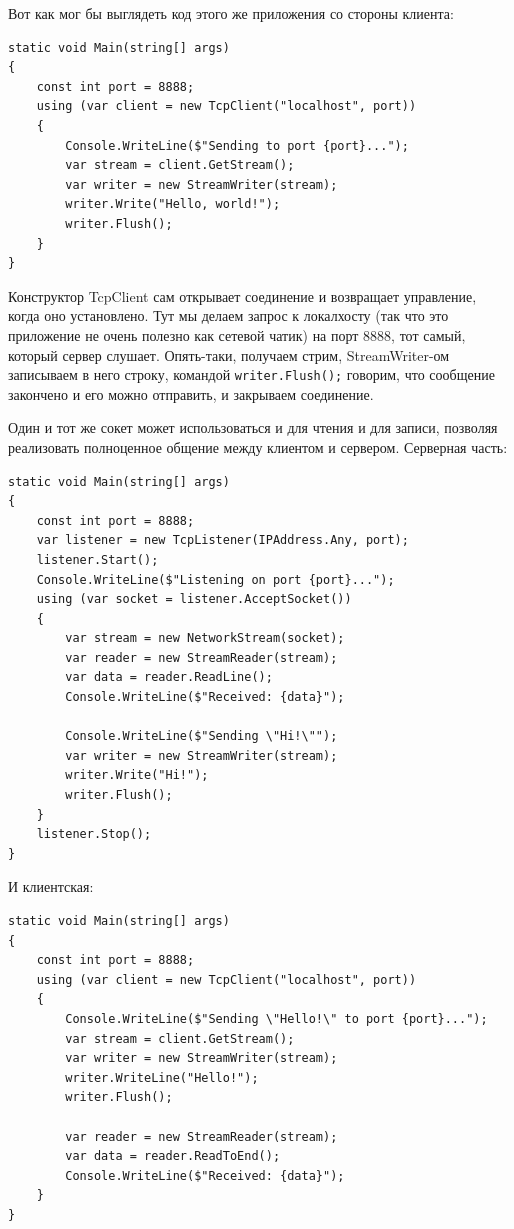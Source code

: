 \documentclass[a5paper]{article}
\begin{document}
Вот как мог бы выглядеть код этого же приложения со стороны клиента:

\begin{verbatim}
static void Main(string[] args)
{
    const int port = 8888;
    using (var client = new TcpClient("localhost", port))
    {
        Console.WriteLine($"Sending to port {port}...");
        var stream = client.GetStream();
        var writer = new StreamWriter(stream);
        writer.Write("Hello, world!");
        writer.Flush();
    }
}
\end{verbatim}

Конструктор TcpClient сам открывает соединение и возвращает управление, когда оно установлено. Тут мы делаем запрос к локалхосту (так что это приложение не очень полезно как сетевой чатик) на порт 8888, тот самый, который сервер слушает. Опять-таки, получаем стрим, StreamWriter-ом записываем в него строку, командой \texttt{writer.Flush();} говорим, что сообщение закончено и его можно отправить, и закрываем соединение.

Один и тот же сокет может использоваться и для чтения и для записи, позволяя реализовать полноценное общение между клиентом и сервером. Серверная часть:

\begin{verbatim}
static void Main(string[] args)
{
    const int port = 8888;
    var listener = new TcpListener(IPAddress.Any, port);
    listener.Start();
    Console.WriteLine($"Listening on port {port}...");
    using (var socket = listener.AcceptSocket())
    {
        var stream = new NetworkStream(socket);
        var reader = new StreamReader(stream);
        var data = reader.ReadLine();
        Console.WriteLine($"Received: {data}");

        Console.WriteLine($"Sending \"Hi!\"");
        var writer = new StreamWriter(stream);
        writer.Write("Hi!");
        writer.Flush();
    }
    listener.Stop();
}
\end{verbatim}

И клиентская: 

\begin{verbatim}
static void Main(string[] args)
{
    const int port = 8888;
    using (var client = new TcpClient("localhost", port))
    {
        Console.WriteLine($"Sending \"Hello!\" to port {port}...");
        var stream = client.GetStream();
        var writer = new StreamWriter(stream);
        writer.WriteLine("Hello!");
        writer.Flush();

        var reader = new StreamReader(stream);
        var data = reader.ReadToEnd();
        Console.WriteLine($"Received: {data}");
    }
}
\end{verbatim}
\end{document}
